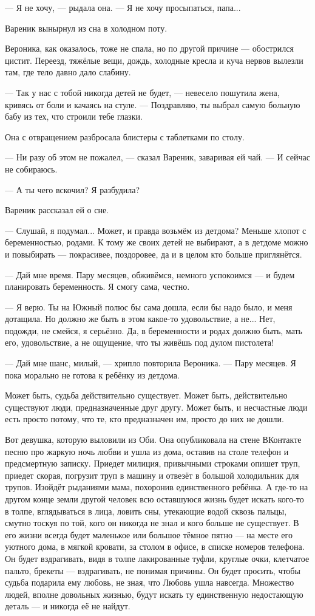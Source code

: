 \documentclass[a4paper,10pt,fleqn]{book}\usepackage{polyglossia}\setdefaultlanguage{english}\setotherlanguage{russian}\defaultfontfeatures{Ligatures=TeX,Mapping=tex-text} \usepackage{xcolor}\definecolor{lightgray}{HTML}{bbbbbb}\color{lightgray}\newcommand{\ml}[3]{\textcolor{black}{#3}}
\newcommand{\asterism}{\vspace{1em}{\centering\Large\bfseries$\ast~\ast~\ast$\par}\vspace{1em}}
\begin{document}
--- Я не хочу, --- рыдала она.
--- Я не хочу просыпаться, папа...

Вареник вынырнул из сна в холодном поту.

Вероника, как оказалось, тоже не спала, но по другой причине --- обострился цистит.
Переезд, тяжёлые вещи, дождь, холодные кресла и куча нервов вылезли там, где тело давно дало слабину.

--- Так у нас с тобой никогда детей не будет, --- невесело пошутила жена, кривясь от боли и качаясь на стуле.
--- Поздравляю, ты выбрал самую больную бабу из тех, что строили тебе глазки.

Она с отвращением разбросала блистеры с таблетками по столу.

--- Ни разу об этом не пожалел, --- сказал Вареник, заваривая ей чай.
--- И сейчас не собираюсь.

--- А ты чего вскочил?
Я разбудила?

Вареник рассказал ей о сне.

--- Слушай, я подумал...
Может, и правда возьмём из детдома?
Меньше хлопот с беременностью, родами.
К тому же своих детей не выбирают, а в детдоме можно и повыбирать --- покрасивее, поздоровее, да и в целом кто больше приглянётся.

--- Дай мне время.
Пару месяцев, обживёмся, немного успокоимся --- и будем планировать беременность.
Я смогу сама, честно.

--- Я верю.
Ты на Южный полюс бы сама дошла, если бы надо было, и меня дотащила.
Но должно же быть в этом какое-то удовольствие, а не...
Нет, подожди, не смейся, я серьёзно.
Да, в беременности и родах должно быть, мать его, удовольствие, а не ощущение, что ты живёшь под дулом пистолета!

--- Дай мне шанс, милый, --- хрипло повторила Вероника.
--- Пару месяцев.
Я пока морально не готова к ребёнку из детдома.

\asterism

Может быть, судьба действительно существует.
Может быть, действительно существуют люди, предназначенные друг другу.
Может быть, и несчастные люди есть просто потому, что те, кто предназначен им, просто до них не дошли.

Вот девушка, которую выловили из Оби.
Она опубликовала на стене ВКонтакте песню про жаркую ночь любви и ушла из дома, оставив на столе телефон и предсмертную записку.
Приедет милиция, привычными строками опишет труп, приедет скорая, погрузит труп в машину и отвезёт в большой холодильник для трупов.
Изойдёт рыданиями мама, похоронив единственного ребёнка.
А где-то на другом конце земли другой человек всю оставшуюся жизнь будет искать кого-то в толпе, вглядываться в лица, ловить сны, утекающие водой сквозь пальцы, смутно тоскуя по той, кого он никогда не знал и кого больше не существует.
В его жизни всегда будет маленькое или большое тёмное пятно --- на месте его уютного дома, в мягкой кровати, за столом в офисе, в списке номеров телефона.
Он будет вздрагивать, видя в толпе лакированные туфли, круглые очки, клетчатое пальто, брекеты --- вздрагивать, не понимая причины.
Он будет просить, чтобы судьба подарила ему любовь, не зная, что Любовь ушла навсегда.
Множество людей, вполне довольных жизнью, будут искать ту единственную недостающую деталь --- и никогда её не найдут.
\end{document}
